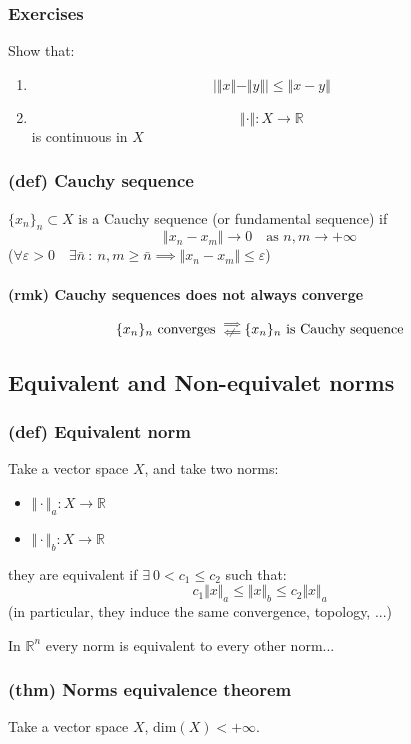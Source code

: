 \subsubsection{Exercises}
Show that:
\begin{enumerate}
    \item $$\Big \vert \Vert x\Vert -\Vert y\Vert \Big \vert \leq \Vert x-y\Vert $$
    \item $$\Vert \cdot \Vert :X\to \mathbb R$$ is continuous in $X$
\end{enumerate}
\subsubsection{(def) Cauchy sequence}
$\{x_n\}_n\subset X$ is a Cauchy sequence (or fundamental sequence) if 
$$\Vert x_n-x_m\Vert \to 0\quad \text{as }n,m\to +\infty$$
($\forall \varepsilon>0 \quad \exists \bar n \ : \ n,m\geq \bar n \implies \Vert x_n-x_m\Vert \leq \varepsilon$)
\paragraph{(rmk) Cauchy sequences does not always converge}
$$\{ x_n\}_n \text{ converges }\substack{\implies\\ \centernot\impliedby} \{x_n\}_n \text{ is Cauchy sequence} $$

\subsection{Equivalent and Non-equivalet norms}
\subsubsection{(def) Equivalent norm}
Take a vector space $X$, and take two norms:
\begin{itemize}
    \item $\Vert\cdot \Vert _a: X\to \mathbb R$
    \item $\Vert\cdot \Vert _b: X\to \mathbb R$
\end{itemize}
they are equivalent if $\exists\ 0<c_1\leq c_2$ such that:
$$c_1\Vert x\Vert_a\leq \Vert x\Vert_b\leq c_2 \Vert x\Vert _a$$
(in particular, they induce the same convergence, topology, ...)

In $\mathbb R^n$ every norm is equivalent to every other norm...
\subsubsection{(thm) Norms equivalence theorem}
Take a vector space $X$, $\text{dim}(X)<+\infty$.

